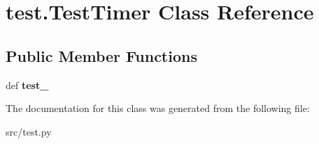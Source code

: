\hypertarget{classtest_1_1_test_timer}{\section{test.\-Test\-Timer \-Class \-Reference}
\label{classtest_1_1_test_timer}
}
\subsection*{\-Public \-Member \-Functions}
\begin{DoxyCompactItemize}
\item 
\hypertarget{classtest_1_1_test_timer_a0b652b39096ce9aef3be80dc3d5fa72f}{def {\bfseries test\-\_\-}}\label{classtest_1_1_test_timer_a0b652b39096ce9aef3be80dc3d5fa72f}

\end{DoxyCompactItemize}


\-The documentation for this class was generated from the following file\-:\begin{DoxyCompactItemize}
\item 
src/test.\-py\end{DoxyCompactItemize}
